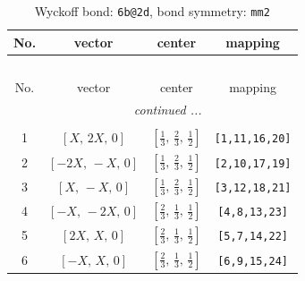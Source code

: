 \documentclass[fleqn,8pt]{jsarticle}
\begin{document}
\begin{longtable}{cccc}
\caption{Wyckoff bond: {\tt 6b@2d}, bond symmetry: {\tt mm2}}
 \\
 \hline \hline
No. & vector & center & mapping \\ \hline \endfirsthead

\multicolumn{3}{l}{\tablename\ \thetable{}} \\
 \hline \hline
No. & vector & center & mapping \\ \hline \endhead

 \hline \hline
\multicolumn{3}{r}{\footnotesize\it continued ...} \\ \endfoot

 \hline \hline
\multicolumn{3}{r}{} \\ \endlastfoot

1 & $\left[ X,\, 2 X,\, 0 \right]$ & $\left[ \frac{1}{3},\, \frac{2}{3},\, \frac{1}{2} \right]$ & {\tt [1,11,16,20]} \\ \hline
2 & $\left[ - 2 X,\, - X,\, 0 \right]$ & $\left[ \frac{1}{3},\, \frac{2}{3},\, \frac{1}{2} \right]$ & {\tt [2,10,17,19]} \\ \hline
3 & $\left[ X,\, - X,\, 0 \right]$ & $\left[ \frac{1}{3},\, \frac{2}{3},\, \frac{1}{2} \right]$ & {\tt [3,12,18,21]} \\ \hline
4 & $\left[ - X,\, - 2 X,\, 0 \right]$ & $\left[ \frac{2}{3},\, \frac{1}{3},\, \frac{1}{2} \right]$ & {\tt [4,8,13,23]} \\ \hline
5 & $\left[ 2 X,\, X,\, 0 \right]$ & $\left[ \frac{2}{3},\, \frac{1}{3},\, \frac{1}{2} \right]$ & {\tt [5,7,14,22]} \\ \hline
6 & $\left[ - X,\, X,\, 0 \right]$ & $\left[ \frac{2}{3},\, \frac{1}{3},\, \frac{1}{2} \right]$ & {\tt [6,9,15,24]} \\
\end{longtable}
\renewcommand{\arraystretch}{1.2}
\end{document}
